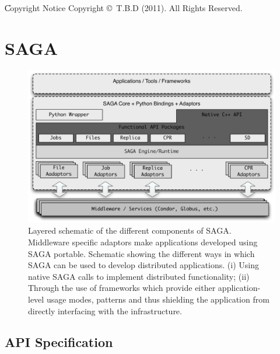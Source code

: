    \U{Copyright Notice}
    Copyright \copyright~T.B.D (2011).  All Rights
    Reserved.\\

  \newpage

  \tableofcontents

  \newpage

                                        
\section {SAGA}

\begin{figure}
    \includegraphics[width=1.0\textwidth]{./figures/figure_02}
    \caption{\footnotesize Layered schematic of the different components
    of SAGA.  Middleware specific adaptors make applications developed
    using SAGA portable.  Schematic showing the different ways in which
    SAGA can be used to develop distributed applications. (i) Using
    native SAGA calls to implement distributed functionality; (ii)
    Through the use of frameworks which provide either application-level
    usage modes, patterns and thus shielding the application from
    directly interfacing with the infrastructure.} \label{sagalayer}
\end{figure}
	
	
\subsection{API Specification}	

